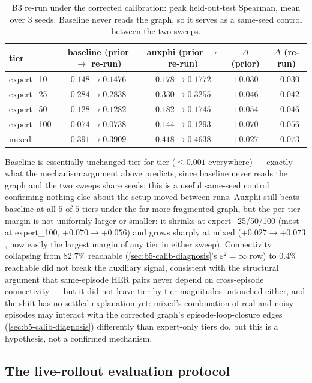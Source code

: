 \documentclass[11pt]{article}
\begin{document}
\begin{table}[h]
\centering
\small
\caption{B3 re-run under the corrected calibration: peak held-out-test Spearman, mean over 3
seeds. Baseline never reads the graph, so it serves as a same-seed control between the two
sweeps.}
\begin{tabular}{lcccc}
\toprule
tier & baseline (prior $\to$ re-run) & auxphi (prior $\to$ re-run) & $\Delta$ (prior) & $\Delta$ (re-run) \\
\midrule
expert\_10  & $0.148 \to 0.1476$ & $0.178 \to \mathbf{0.1772}$ & $+0.030$ & $+0.030$ \\
expert\_25  & $0.284 \to 0.2838$ & $0.330 \to \mathbf{0.3255}$ & $+0.046$ & $+0.042$ \\
expert\_50  & $0.128 \to 0.1282$ & $0.182 \to \mathbf{0.1745}$ & $+0.054$ & $+0.046$ \\
expert\_100 & $0.074 \to 0.0738$ & $0.144 \to \mathbf{0.1293}$ & $+0.070$ & $+0.056$ \\
mixed       & $0.391 \to 0.3909$ & $0.418 \to \mathbf{0.4638}$ & $+0.027$ & $+0.073$ \\
\bottomrule
\end{tabular}
\end{table}

Baseline is essentially unchanged tier-for-tier ($\le0.001$ everywhere) --- exactly what the
mechanism argument above predicts, since baseline never reads the graph and the two sweeps
share seeds; this is a useful same-seed control confirming nothing else about the setup moved
between runs. Auxphi still beats baseline at all $5$ of $5$ tiers under the far more fragmented
graph, but the per-tier margin is not uniformly larger or smaller: it shrinks at
expert\_25/50/100 (most at expert\_100, $+0.070\to+0.056$) and grows sharply at mixed
($+0.027\to+0.073$, now easily the largest margin of any tier in either sweep). Connectivity
collapsing from $82.7\%$ reachable (\cref{sec:b5-calib-diagnosis}'s $\varepsilon^2{=}\infty$ row)
to $0.4\%$ reachable did not break the auxiliary signal, consistent with the structural argument
that same-episode HER pairs never depend on cross-episode connectivity --- but it did not leave
tier-by-tier magnitudes untouched either, and the shift has no settled explanation yet: mixed's
combination of real and noisy episodes may interact with the corrected graph's episode-loop-closure
edges (\cref{sec:b5-calib-diagnosis}) differently than expert-only tiers do, but this is a
hypothesis, not a confirmed mechanism.

\subsection{The live-rollout evaluation protocol}
\label{sec:b5-eval-protocol}
\end{document}
